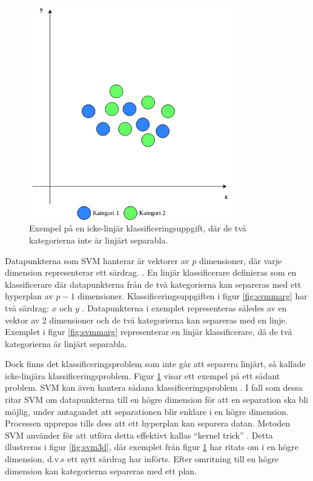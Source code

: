 \documentclass{kaumasters} %
\begin{document}
\begin{figure}[H]
\includegraphics[width=9cm]{nonlinearsvm}
\centering
\caption{Exempel på en icke-linjär klassificeringsuppgift, där de två kategorierna inte är linjärt separabla.}
\label{fig:svmnonl}
\end{figure}

Datapunkterna som SVM hanterar är vektorer av $p$ dimensioner, där varje dimension representerar ett särdrag. \cite{svm:002}. En linjär klassificerare definieras som en klassificerare där datapunkterna från de två kategorierna kan separeras med ett hyperplan av $p-1$ dimensioner. Klassificeringsuppgiften i figur \ref{fig:svmmarg} har två särdrag: $x$ och $y$ \cite{svm:005}. Datapunkterna i exemplet representeras således av en vektor av 2 dimensioner och de två kategorierna kan separeras med en linje. Exemplet i figur \ref{fig:svmmarg} representerar en linjär klassificerare, då de två kategorierna är linjärt separabla.

Dock finns det klassificeringsproblem som inte går att separera linjärt, så kallade icke-linjära klassificeringsproblem. Figur \ref{fig:svmnonl} visar ett exempel på ett sådant problem. SVM kan även hantera sådana klassificeringsproblem \cite{svm:002}. I fall som dessa ritar SVM om datapunkterna till en högre dimension för att en separation ska bli möjlig, under antagandet att separationen blir enklare i en högre dimension. Processen upprepas tills dess att ett hyperplan kan separera datan. Metoden SVM använder för att utföra detta effektivt kallas “kernel trick” \cite{svm:004}. Detta illustreras i figur \ref{fig:svm3d}, där exemplet från figur \ref{fig:svmnonl} har ritats om i en högre dimension, d.v.s ett nytt särdrag har införts. Efter omritning till en högre dimension kan kategorierna separeras med ett plan. 
\end{document}
